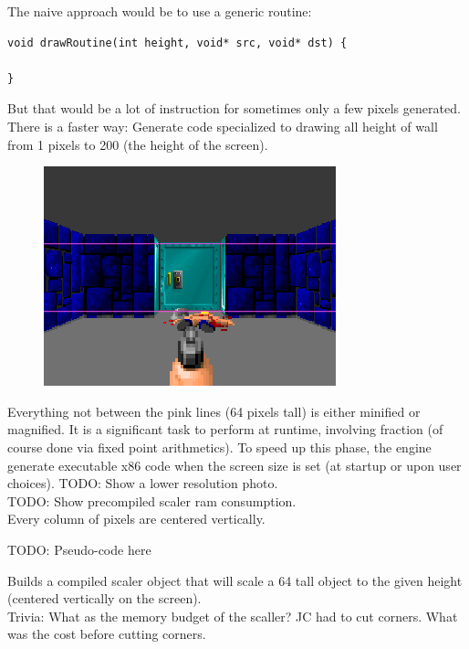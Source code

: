 The naive approach would be to use a generic routine:\\
\begin{verbatim}
void drawRoutine(int height, void* src, void* dst) {
  
}
\end{verbatim}
\par
But that would be a lot of instruction for sometimes only a few pixels generated. There is a faster way: Generate code specialized to drawing all height of wall from 1 pixels to 200 (the height of the screen).\\
\par
 \begin{figure}[H]
\centering
 \includegraphics[width=\textwidth]{imgs/scaling_walls.png}
 \end{figure}
\par
Everything not between the pink lines (64 pixels tall) is either minified or magnified. It is a significant task to perform at runtime, involving fraction (of course done via fixed point arithmetics). To speed up this phase, the engine generate executable x86 code when the screen size is set (at startup or upon user choices).
TODO: Show a lower resolution photo.\\
TODO: Show precompiled scaler ram consumption.\\
Every column of pixels are centered vertically.



TODO: Pseudo-code here\\
\par
Builds a compiled scaler object that will scale a 64 tall object to the given height (centered vertically on the screen).
\\
Trivia: What as the memory budget of the scaller? JC had to cut corners. What was the cost before cutting corners.\\
\par
\begin{minipage}{\textwidth}

\end{minipage}

